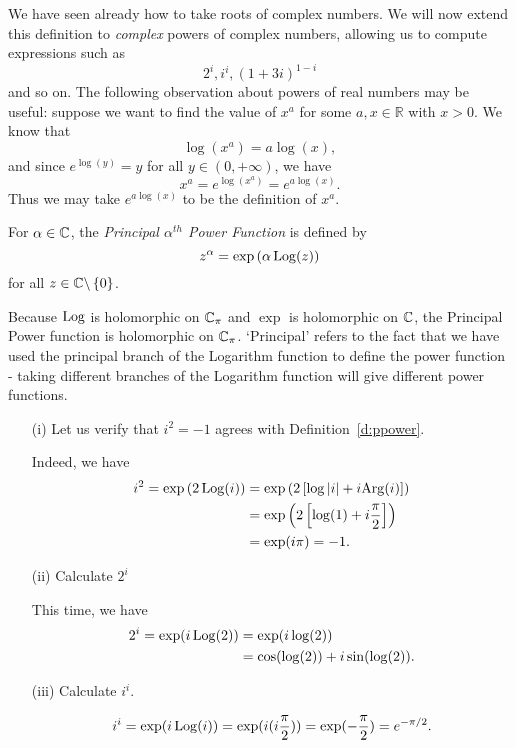 \bigskip
We have seen already how to take roots of complex numbers. We will now extend this definition to \emph{complex} powers of complex numbers, allowing us to compute expressions such as
\[
2^{i}, i^{i}, (1+3i)^{1-i}
\]
and so on.  The following observation about powers of real numbers may be useful: suppose we want to find the value of $x^a$ for some $a,x \in \mathbb{R}$ with $x>0$.  We know that
\[
\log (x^a) = a \log (x),
\]
and since $e^{\log(y)}=y$ for all $y \in (0,+\infty)$, we have
\[
x^a = e^{  \log \left( x^a \right) } = e^{  a \log (x) }.
\]
Thus we may take $e^{ a \log (x) }$ to be the definition of $x^a$.
\begin{definition}
\label{d:ppower}
For $\alpha \in \mathbb{C}$, the \emph{Principal $\alpha^{th}$ Power Function} is defined by
\[
z^{\alpha} = \exp \left( \alpha \operatorname{Log} (z) \right)
\]
for all $z \in \mathbb{C} \backslash \left\{0\right\}$.
\end{definition}
Because $\operatorname{Log}$ is holomorphic on $\mathbb{C}_{\pi}$ and $\exp$ is holomorphic on $\mathbb{C}$, the Principal Power function is holomorphic on $\mathbb{C}_{\pi}$.  `Principal' refers to the fact that we have used the principal branch of the Logarithm function to define the power function - taking different branches of the Logarithm function will give different power functions.

\begin{example}
\begin{enumerate}
\item[(i)] Let us verify that $i^2=-1$ agrees with Definition~\ref{d:ppower}.

Indeed, we have
\begin{align*}
i^2 = \exp \left( 2 \operatorname{Log} (i) \right) & = \exp \left( 2 \left[ \log \left| i \right|+i \mathrm{Arg}(i) \right] \right) \\
& = \exp \left( 2 \left[ \log(1)+i \frac{\pi}{2} \right] \right) \\
& = \exp(i\pi) = -1.
\end{align*}
\item[(ii)] Calculate $2^i$

This time, we have
\begin{align*}
2^i = \exp(i \operatorname{Log}(2) ) & = \exp(i \log (2) ) \\
& = \cos(\log(2))+i \sin(\log(2)).
\end{align*}
\item[(iii)] Calculate $i^i$.

\[
i^i = \exp(i\operatorname{Log}(i)) = \exp (i ( i \frac{\pi}{2})) = \exp(-\frac{\pi}{2}) = e^{-\pi/2}.
\]
\end{enumerate}
\end{example}

